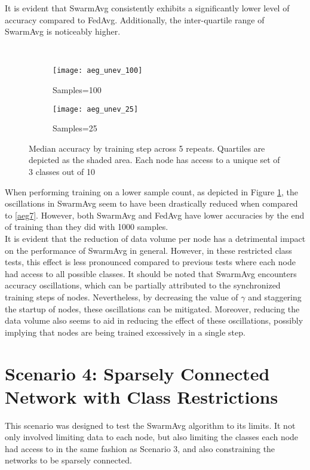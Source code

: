 It is evident that SwarmAvg consistently exhibits a significantly lower level of accuracy compared to FedAvg. Additionally, the inter-quartile range of SwarmAvg is noticeably higher.

\begin{figure}[H] 
	 \\
	\begin{subfigure}{0.49\textwidth}
		\texttt{[image: aeg\_unev\_100]}
		\caption{Samples=100}
	\end{subfigure}
	\begin{subfigure}{0.49\textwidth}
		\texttt{[image: aeg\_unev\_25]}
		\caption{Samples=25}
	\end{subfigure}
	\caption{Median accuracy by training step across 5 repeats. Quartiles are depicted as the shaded area. Each node has access to a unique set of 3 classes out of 10}
	\label{aeg8}
\end{figure}

When performing training on a lower sample count, as depicted in Figure \ref{aeg8}, the oscillations in SwarmAvg seem to have been drastically reduced when compared to \ref{aeg7}. However, both SwarmAvg and FedAvg have lower accuracies by the end of training than they did with 1000 samples. \\

It is evident that the reduction of data volume per node has a detrimental impact on the performance of SwarmAvg in general. However, in these restricted class tests, this effect is less pronounced compared to previous tests where each node had access to all possible classes. It should be noted that SwarmAvg encounters accuracy oscillations, which can be partially attributed to the synchronized training steps of nodes. Nevertheless, by decreasing the value of $\gamma$ and staggering the startup of nodes, these oscillations can be mitigated. Moreover, reducing the data volume also seems to aid in reducing the effect of these oscillations, possibly implying that nodes are being trained excessively in a single step.

\section{Scenario 4: Sparsely Connected Network with Class Restrictions}
This scenario was designed to test the SwarmAvg algorithm to its limits. It not only involved limiting data to each node, but also limiting the classes each node had access to in the same fashion as Scenario 3, and also constraining the networks to be sparsely connected.

